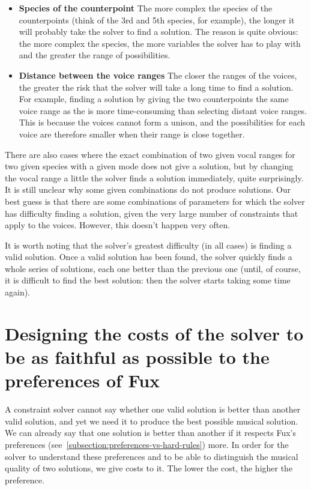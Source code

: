 \begin{itemize}
    \item \textbf{Species of the counterpoint} \textendash{} The more complex the species of the counterpoints (think of the 3rd and 5th species, for example), the longer it will probably take the solver to find a solution. The reason is quite obvious: the more complex the species, the more variables the solver has to play with and the greater the range of possibilities.  
    \item \textbf{Distance between the voice ranges} \textendash{}  The closer the ranges of the voices, the greater the risk that the solver will take a long time to find a solution. For example, finding a solution by giving the two counterpoints the same voice range as the \cfs is more time-consuming than selecting distant voice ranges. This is because the voices cannot form a unison, and the possibilities for each voice are therefore smaller when their range is close together. 
\end{itemize}
There are also cases where the exact combination of two given vocal ranges for two given species with a given mode does not give a solution, but by changing the vocal range a little the solver finds a solution immediately, quite surprisingly. It is still unclear why some given combinations do not produce solutions. Our best guess is that there are some combinations of parameters for which the solver has difficulty finding a solution, given the very large number of constraints that apply to the voices. However, this doesn't happen very often.

It is worth noting that the solver's greatest difficulty (in all cases) is finding a valid solution. Once a valid solution has been found, the solver quickly finds a whole series of solutions, each one better than the previous one (until, of course, it is difficult to find the best solution: then the solver starts taking some time again).


\section{Designing the costs of the solver to be as faithful as possible to the preferences of Fux} \label{costs}
A constraint solver cannot say whether one valid solution is better than another valid solution, and yet we need it to produce the best possible musical solution. We can already say that one solution is better than another if it respects Fux's preferences (see~\ref{subsection:preferences-vs-hard-rules}) more. In order for the solver to understand these preferences and to be able to distinguish the musical quality of two solutions, we give costs to it.  The lower the cost, the higher the preference.

